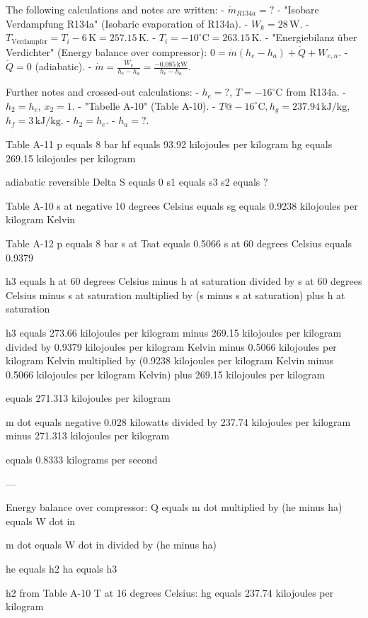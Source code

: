 The following calculations and notes are written:  
- \( \dot{m}_{R134a} = ? \)  
- "Isobare Verdampfung R134a" (Isobaric evaporation of R134a).  
- \( W_k = 28 \, \text{W} \).  
- \( T_{\text{Verdampfer}} = T_i - 6 \, \text{K} = 257.15 \, \text{K} \).  
- \( T_i = -10^\circ \text{C} = 263.15 \, \text{K} \).  
- "Energiebilanz über Verdichter" (Energy balance over compressor):  
  \( 0 = \dot{m} (h_e - h_a) + \dot{Q} + W_{e,n} \).  
  - \( \dot{Q} = 0 \) (adiabatic).  
  - \( \dot{m} = \frac{W_k}{h_e - h_a} = \frac{-0.085 \, \text{kW}}{h_e - h_a} \).  

Further notes and crossed-out calculations:  
- \( h_e = ? \), \( T = -16^\circ \text{C} \) from R134a.  
- \( h_2 = h_e \), \( x_2 = 1 \).  
- "Tabelle A-10" (Table A-10).  
- \( T@-16^\circ \text{C}, h_g = 237.94 \, \text{kJ/kg} \), \( h_f = 3 \, \text{kJ/kg} \).  
- \( h_2 = h_e \).  
- \( h_a = ? \).

Table A-11  
p equals 8 bar  
hf equals 93.92 kilojoules per kilogram  
hg equals 269.15 kilojoules per kilogram  

adiabatic reversible  
Delta S equals 0  
s1 equals s3  
s2 equals ?  

Table A-10  
s at negative 10 degrees Celsius equals sg equals 0.9238 kilojoules per kilogram Kelvin  

Table A-12  
p equals 8 bar  
s at Tsat equals 0.5066  
s at 60 degrees Celsius equals 0.9379  

h3 equals h at 60 degrees Celsius minus h at saturation  
divided by s at 60 degrees Celsius minus s at saturation  
multiplied by (s minus s at saturation) plus h at saturation  

h3 equals  
273.66 kilojoules per kilogram minus 269.15 kilojoules per kilogram  
divided by 0.9379 kilojoules per kilogram Kelvin minus 0.5066 kilojoules per kilogram Kelvin  
multiplied by (0.9238 kilojoules per kilogram Kelvin minus 0.5066 kilojoules per kilogram Kelvin)  
plus 269.15 kilojoules per kilogram  

equals 271.313 kilojoules per kilogram  

m dot equals negative 0.028 kilowatts  
divided by 237.74 kilojoules per kilogram minus 271.313 kilojoules per kilogram  

equals 0.8333 kilograms per second  

---

Energy balance over compressor:  
Q equals m dot multiplied by (he minus ha) equals W dot in  

m dot equals W dot in divided by (he minus ha)  

he equals h2  
ha equals h3  

h2 from Table A-10  
T at 16 degrees Celsius: hg equals 237.74 kilojoules per kilogram